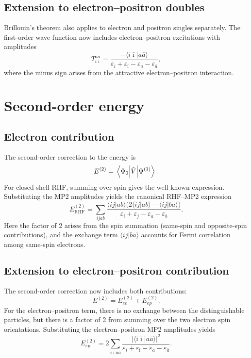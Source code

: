 \documentclass[11pt]{article}
\begin{document}
\subsection*{Extension to electron--positron doubles}

Brillouin's theorem also applies to electron and positron singles separately.
The first-order wave function now includes electron--positron excitations
with amplitudes
\begin{equation}
T_{i\bar\imath}^{a\bar a}
=
\frac{-\langle i\bar\imath | a\bar a\rangle}{\varepsilon_i + \varepsilon_{\bar\imath} - \varepsilon_a - \varepsilon_{\bar a}},
\end{equation}
where the minus sign arises from the attractive electron--positron interaction.

\section*{Second-order energy}

\subsection*{Electron contribution}

The second-order correction to the energy is
\begin{equation}
E^{(2)} = \mel{\Phi_0}{\hat V}{\Psi^{(1)}}.
\end{equation}
For closed-shell RHF, summing over spin gives the well-known expression.
Substituting the MP2 amplitudes yields the canonical RHF--MP2 expression
\begin{equation}
\boxed{
E^{(2)}_{\mathrm{RHF}}
=
\sum_{ijab}
\frac{\langle ij | ab\rangle\bigl(2\langle ij | ab\rangle - \langle ij | ba\rangle\bigr)}
{\varepsilon_i + \varepsilon_j - \varepsilon_a - \varepsilon_b}
}.
\end{equation}
Here the factor of 2 arises from the spin summation (same-spin and opposite-spin
contributions), and the exchange term $\langle ij | ba\rangle$ accounts for
Fermi correlation among same-spin electrons.

\subsection*{Extension to electron--positron contribution}

The second-order correction now includes both contributions:
\begin{equation}
E^{(2)} = E^{(2)}_{ee} + E^{(2)}_{ep}.
\end{equation}
For the electron--positron term, there is no exchange between the distinguishable
particles, but there is a factor of 2 from summing over the two electron spin
orientations. Substituting the electron--positron MP2 amplitudes yields
\begin{equation}
\boxed{
E^{(2)}_{ep}
=
2\sum_{i\bar\imath a\bar a}
\frac{\big|\langle i\bar\imath | a\bar a\rangle\big|^2}
{\varepsilon_i + \varepsilon_{\bar\imath} - \varepsilon_a - \varepsilon_{\bar a}}
}.
\end{equation}
\end{document}
